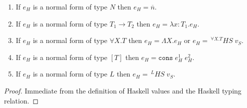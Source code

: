 \begin{hcf}
\label{hcf}
\mbox{}
\begin{enumerate}
\item If $e_{H}$ is a normal form of type $N$ then $e_{H}=\overline{n}$.
\item If $e_{H}$ is a normal form of type $T_{1}\rightarrow T_{2}$ then $e_{H}=\lambda x:T_{1}.e_{H}$.
\item If $e_{H}$ is a normal form of type $\forall X.T$ then $e_{H}=\Lambda X.e_{H}$ or $e_{H}=\,^{\forall X.T}HS\;v_{S}$.
\item If $e_{H}$ is a normal form of type $[T]$ then $e_{H}=\mathtt{cons}\;e_{H}^{1}\;e_{H}^{2}$.
\item If $e_{H}$ is a normal form of type $L$ then $e_{H}=\,^{L}HS\;v_{S}$.
\end{enumerate}
\begin{proof}
Immediate from the definition of Haskell values and the Haskell typing relation.
\end{proof}
\end{hcf}